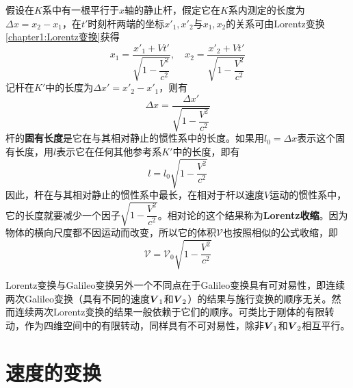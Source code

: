 假设在$K$系中有一根平行于$x$轴的静止杆，假定它在$K$系内测定的长度为$\Delta x=x_2-x_1$，在$t'$时刻杆两端的坐标$x'_1,x'_2$与$x_1,x_2$的关系可由Lorentz变换\eqref{chapter1:Lorentz变换}获得
\begin{equation*}
	x_1 = \frac{x'_1 + Vt'}{\sqrt{1-\dfrac{V^2}{c^2}}},\quad x_2 = \frac{x'_2 + Vt'}{\sqrt{1-\dfrac{V^2}{c^2}}}
\end{equation*}
记杆在$K'$中的长度为$\Delta x'= x'_2-x'_1$，则有
\begin{equation*}
	\Delta x = \frac{\Delta x'}{\sqrt{1-\dfrac{V^2}{c^2}}}
\end{equation*}
杆的{\bf 固有长度}是它在与其相对静止的惯性系中的长度。如果用$l_0 = \Delta x$表示这个固有长度，用$l$表示它在任何其他参考系$K'$中的长度，即有
\begin{equation}
	l = l_0\sqrt{1-\frac{V^2}{c^2}}
	\label{chapter1:固有长度}
\end{equation}
因此，杆在与其相对静止的惯性系中最长，在相对于杆以速度$V$运动的惯性系中，它的长度就要减少一个因子$\sqrt{1-\dfrac{V^2}{c^2}}$。相对论的这个结果称为{\bf Lorentz收缩}。因为物体的横向尺度都不因运动而改变，所以它的体积$\mathscr{V}$也按照相似的公式收缩，即
\begin{equation}
	\mathscr{V} = \mathscr{V}_0\sqrt{1-\frac{V^2}{c^2}}
	\label{chapter1:固有体积}
\end{equation}

Lorentz变换与Galileo变换另外一个不同点在于Galileo变换具有可对易性，即连续两次Galileo变换（具有不同的速度$\boldsymbol{V}_1$和$\boldsymbol{V}_2$）的结果与施行变换的顺序无关。然而连续两次Lorentz变换的结果一般依赖于它们的顺序。可类比于刚体的有限转动，作为四维空间中的有限转动，同样具有不可对易性，除非$\boldsymbol{V}_1$和$\boldsymbol{V}_2$相互平行。

\section{速度的变换}


